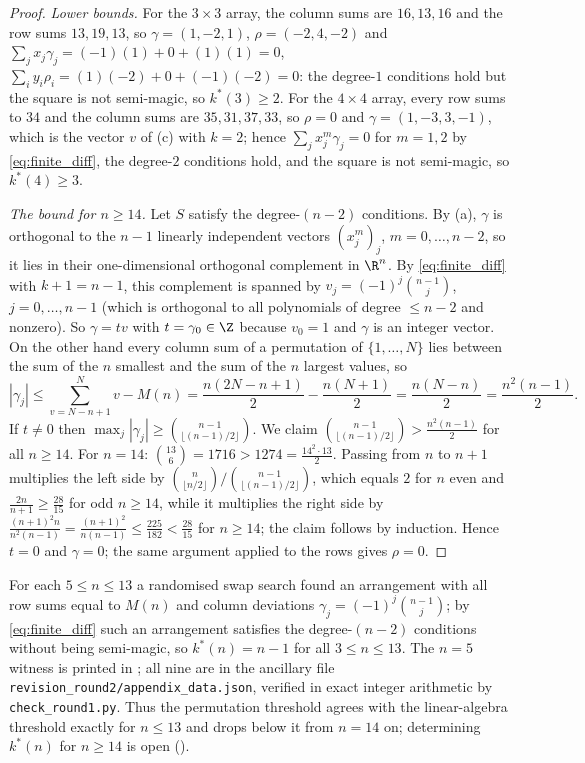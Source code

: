 \begin{proof}
\emph{Lower bounds.}  For the $3\times3$ array, the column sums are $16,13,16$ and the row sums $13,19,13$, so
$\gamma=(1,-2,1)$, $\rho=(-2,4,-2)$ and $\sum_jx_j\gamma_j=(-1)(1)+0+(1)(1)=0$, $\sum_iy_i\rho_i=(1)(-2)+0+(-1)(-2)=0$:
the degree-$1$ conditions hold but the square is not semi-magic, so $k^{*}(3)\ge2$.
For the $4\times4$ array, every row sums to $34$ and the column sums are $35,31,37,33$, so $\rho=0$ and
$\gamma=(1,-3,3,-1)$, which is the vector $v$ of (c) with $k=2$; hence
$\sum_jx_j^{m}\gamma_j=0$ for $m=1,2$ by \eqref{eq:finite_diff}, the degree-$2$ conditions hold, and the square
is not semi-magic, so $k^{*}(4)\ge3$.

\emph{The bound for $n\ge14$.}  Let $S$ satisfy the degree-$(n-2)$ conditions.  By (a), $\gamma$ is orthogonal to the
$n-1$ linearly independent vectors $(x_j^{m})_j$, $m=0,\dots,n-2$, so it lies in their one-dimensional orthogonal
complement in $\R^{n}$.  By \eqref{eq:finite_diff} with $k+1=n-1$, this complement is spanned by
$v_j=(-1)^{j}\binom{n-1}{j}$, $j=0,\dots,n-1$ (which is orthogonal to all polynomials of degree $\le n-2$ and
nonzero).  So $\gamma=tv$ with $t=\gamma_0\in\Z$ because $v_0=1$ and $\gamma$ is an integer vector.
On the other hand every column sum of a permutation of $\{1,\dots,N\}$ lies between the sum of the $n$ smallest
and the sum of the $n$ largest values, so
\[
|\gamma_j|\le\sum_{v=N-n+1}^{N}v-M(n)=\frac{n(2N-n+1)}{2}-\frac{n(N+1)}{2}=\frac{n(N-n)}{2}=\frac{n^{2}(n-1)}{2}.
\]
If $t\ne0$ then $\max_j|\gamma_j|\ge\binom{n-1}{\lfloor(n-1)/2\rfloor}$.  We claim
$\binom{n-1}{\lfloor(n-1)/2\rfloor}>\frac{n^{2}(n-1)}2$ for all $n\ge14$.  For $n=14$: $\binom{13}{6}=1716>1274=\frac{14^{2}\cdot13}{2}$.
Passing from $n$ to $n+1$ multiplies the left side by $\binom{n}{\lfloor n/2\rfloor}/\binom{n-1}{\lfloor(n-1)/2\rfloor}$,
which equals $2$ for $n$ even and $\frac{2n}{n+1}\ge\frac{28}{15}$ for odd $n\ge14$, while it multiplies the right side by
$\frac{(n+1)^{2}n}{n^{2}(n-1)}=\frac{(n+1)^{2}}{n(n-1)}\le\frac{225}{182}<\frac{28}{15}$ for $n\ge14$; the claim follows by induction.
Hence $t=0$ and $\gamma=0$; the same argument applied to the rows gives $\rho=0$.
\end{proof}

\begin{remark}[$k^{*}(n)=n-1$ for $5\le n\le13$; computer-verified]
\label{rem:kstar_search}
For each $5\le n\le13$ a randomised swap search found an arrangement with all row sums equal to $M(n)$ and column deviations
$\gamma_j=(-1)^{j}\binom{n-1}{j}$; by \eqref{eq:finite_diff} such an arrangement satisfies the degree-$(n-2)$ conditions
without being semi-magic, so $k^{*}(n)=n-1$ for all $3\le n\le13$.  The $n=5$ witness is printed in ;
all nine are in the ancillary file \texttt{revision\_round2/appendix\_data.json}, verified in exact integer arithmetic by
\texttt{check\_round1.py}.  Thus the permutation threshold agrees with the linear-algebra threshold exactly for $n\le13$ and drops
below it from $n=14$ on; determining $k^{*}(n)$ for $n\ge14$ is open ().
\end{remark}

